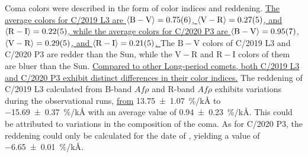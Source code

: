 Coma colors were described in the form of color indices and reddening. 
\ul{
    The average colors for C/2019 L3 are  
$\langle \mathrm{B} - \mathrm{V} \rangle = \num{0.75 +- 0.06}$, 
$\langle \mathrm{V} - \mathrm{R} \rangle = \num{0.27 +- 0.05}$, and 
$\langle \mathrm{R} - \mathrm{I} \rangle = \num{0.22 +- 0.05}$,  
while the average colors for C/2020 P3 are 
$\langle \mathrm{B} - \mathrm{V} \rangle = \num{0.95 +- 0.07}$, 
$\langle \mathrm{V} - \mathrm{R} \rangle = \num{0.29 +- 0.05}$, and 
$\langle \mathrm{R} - \mathrm{I} \rangle = \num{0.21 +- 0.05}$. 
}
The $\mathrm{B} - \mathrm{V}$ colors of C/2019 L3 and C/2020 P3 are redder than the Sun, while the $\mathrm{V} - \mathrm{R}$ and $\mathrm{R} - \mathrm{I}$ colors of them are bluer than the Sun. \ul{Compared to other Long-period comets, both C/2019 L3 and C/2020 P3 exhibit distinct differences in their color indices.} The reddening of C/2019 L3 calculated from B-band $Af\rho$ and R-band $Af\rho$ exhibits variations during the observational runs, \ul{from} {\SI{13.75 +- 1.07}{\percent/\kilo\angstrom}} to {\SI{-15.69 +- 0.37}{\percent/\kilo\angstrom}} with an average value of {\SI{0.94 +- 0.23}{\percent/\kilo\angstrom}}. This could be attributed to  variations in the composition of the coma. As for C/2020 P3, the reddening could only be calculated for the date of , yielding a value of {\SI{-6.65 +- 0.01}{\percent/\kilo\angstrom}}. 


